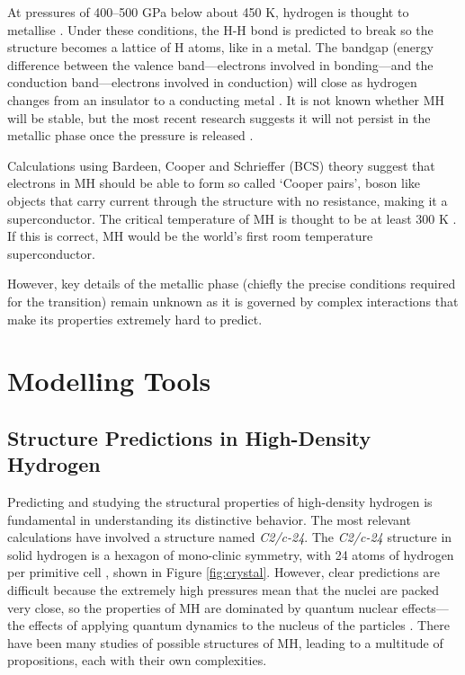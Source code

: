 \documentclass[esp]{FCEFyN-class}
\begin{document}
At pressures of 400--500 GPa below about 450 K, hydrogen is thought to metallise \cite{dalladay2016}. Under these conditions, the H-H bond is predicted to break so the structure becomes a lattice of H atoms, like in a metal. The bandgap (energy difference between the valence band---electrons involved in bonding---and the conduction band---electrons involved in conduction) will close as hydrogen changes from an insulator to a conducting metal \cite{Morales2013}. It is not known whether MH will be stable, but the most recent research suggests it will not persist in the metallic phase once the pressure is released \cite{ackland2017stability}.

Calculations using Bardeen, Cooper and Schrieffer (BCS) theory \cite{Solyom2009} suggest that electrons in MH should be able to form so called `Cooper pairs', boson like objects that carry current through the structure with no resistance, making it a superconductor. The critical temperature of MH is thought to be at least 300 K \cite{ashcroft1968metallic}. If this is correct, MH would be the world's first room temperature superconductor.

However, key details of the metallic phase (chiefly the precise conditions required for the transition) remain unknown as it is governed by complex interactions that make its properties extremely hard to predict.
\vspace{7mm} %
\section{Modelling Tools}
\label{sec:model}


\subsection{Structure Predictions in High-Density Hydrogen}

Predicting and studying the structural properties of high-density hydrogen is fundamental in understanding its distinctive behavior. The most relevant calculations have involved a structure named \textit{C2/c-24}. The \textit{C2/c-24} structure in solid hydrogen is a hexagon of mono-clinic symmetry, with 24 atoms of hydrogen per primitive cell \cite{Monserrat2016}, shown in Figure \ref{fig:crystal}. However, clear predictions are difficult because the extremely high pressures mean that the nuclei are packed very close, so the properties of MH are dominated by quantum nuclear effects---the effects of applying quantum dynamics to the nucleus of the particles \cite{loubeyre2020}. There have been many studies of possible structures of MH, leading to a multitude of propositions, each with their own complexities.
\end{document}
